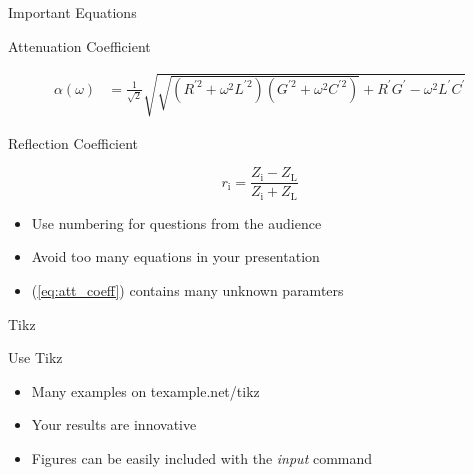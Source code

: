 \documentclass[english,american,german,aspectratio=169]{beamer}
\begin{document}
\begin{frame}{Important Equations}

  \begin{block}{Attenuation Coefficient}

    \begin{align}
      \alpha\left(\omega\right) &
      =\frac{1}{\sqrt{2}}\sqrt{\sqrt{\left(R^{\prime2}+\omega^{2}L^{\prime2}\right)\left(G^{\prime2}+\omega^{2}C^{\prime2}\right)}+R^{\prime}G^{\prime}-\omega^{2}L^{\prime}C^{\prime}}\label{eq:att_coeff}
    \end{align}

  \end{block}

  \begin{block}{Reflection Coefficient}

    \begin{equation}
      r_{\mathrm{i}}=\frac{Z_{\mathrm{i}}-Z{}_{\mathrm{L}}}{Z_{\mathrm{i}}+Z{}_{\mathrm{L}}}
    \end{equation}

  \end{block}
  \begin{itemize}
    \item Use numbering for questions from the audience
    \item Avoid too many equations in your presentation
    \item (\ref{eq:att_coeff}) contains many unknown paramters
  \end{itemize}
\end{frame}

\begin{frame}{Tikz}

  \begin{center}
    \begin{figure}
      \scalebox{0.75}{}
    \end{figure}
    \par
  \end{center}
  \begin{block}{Use Tikz}

    \begin{itemize}
      \item Many examples on texample.net/tikz
      \item Your results are innovative
      \item Figures can be easily included with the \textit{input} command
    \end{itemize}
  \end{block}
\end{frame}
\end{document}
